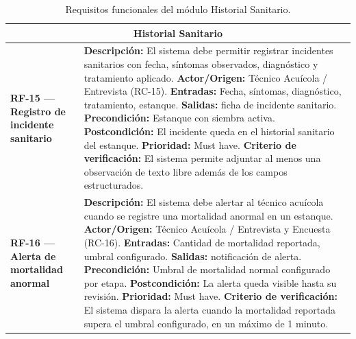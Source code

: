 \documentclass[11pt,a4paper]{article}
\begin{document}
\begin{longtable}{|p{3.5cm}|p{12cm}|}
\caption{Requisitos funcionales del módulo Historial Sanitario.}
\label{tab:rf-historial-sanitario} \\
\hline

\multicolumn{2}{|c|}{\textbf{Historial Sanitario}} \\ \hline


\textbf{RF-15 — Registro de incidente sanitario} &
\textbf{Descripción:} El sistema debe permitir registrar incidentes sanitarios con fecha, síntomas observados, diagnóstico y tratamiento aplicado. \newline
\textbf{Actor/Origen:} Técnico Acuícola / Entrevista (RC-15). \newline
\textbf{Entradas:} Fecha, síntomas, diagnóstico, tratamiento, estanque. \newline
\textbf{Salidas:} ficha de incidente sanitario. \newline
\textbf{Precondición:} Estanque con siembra activa. \newline
\textbf{Postcondición:} El incidente queda en el historial sanitario del estanque. \newline
\textbf{Prioridad:} Must have. \newline
\textbf{Criterio de verificación:} El sistema permite adjuntar al menos una observación de texto libre además de los campos estructurados. \\ \hline

\textbf{RF-16 — Alerta de mortalidad anormal} &
\textbf{Descripción:} El sistema debe alertar al técnico acuícola cuando se registre una mortalidad anormal en un estanque. \newline
\textbf{Actor/Origen:} Técnico Acuícola / Entrevista y Encuesta (RC-16). \newline
\textbf{Entradas:} Cantidad de mortalidad reportada, umbral configurado. \newline
\textbf{Salidas:} notificación de alerta. \newline
\textbf{Precondición:} Umbral de mortalidad normal configurado por etapa. \newline
\textbf{Postcondición:} La alerta queda visible hasta su revisión. \newline
\textbf{Prioridad:} Must have. \newline
\textbf{Criterio de verificación:} El sistema dispara la alerta cuando la mortalidad reportada supera el umbral configurado, en un máximo de 1 minuto. \\ \hline

\end{longtable}
\end{document}
